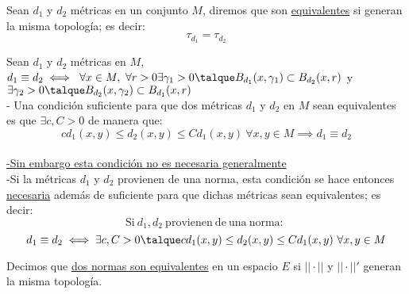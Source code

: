 	\begin{defi} Sean $d_1$ y $d_2$ m\'etricas en un conjunto $M$, diremos que son 				 					\underline{equivalentes} si generan la misma topolog\'ia; es decir:
		\[\tau_{d_1}=\tau_{d_2}\]
	\end{defi}
	
	\begin{proposicion} Sean $d_1$ y $d_2$ m\'etricas en $M$, $d_1 \equiv d_2 \iff \ \forall x\in M, \ \forall r>0 \\ \exists\gamma_1>0\talque B_{d_1}(x,\gamma_1)\subset B_{d_2}(x,r)$ y $ \exists\gamma_2>0\talque B_{d_2}(x,\gamma_2)\subset B_{d_1}(x,r)$\\
	
	- Una condici\'on suficiente para que dos m\'etricas $d_1$ y $d_2$ en $M$ sean equivalentes es que $\exists c,C>0$ de manera que:
	\[cd_1(x,y)\leq d_2(x,y)\leq Cd_1(x,y)\ \forall x,y\in M\implies d_1\equiv d_2\] \\
	\underline{-Sin embargo esta condici\'on no es necesaria generalmente}\\
	-Si la m\'etricas $d_1$ y $d_2$ provienen de una norma, esta condici\'on se hace entonces \underline{necesaria} adem\'as de suficiente para que dichas m\'etricas sean equivalentes; es decir:
	\[\mathrm{Si\ }d_1,d_2\mathrm{\ provienen\ de\ una\ norma:\ }\]
	\[d_1\equiv d_2\iff \exists c,C>0 \talque cd_1(x,y)\leq d_2(x,y)\leq Cd_1(x,y)\ \forall x,y\in M\]
	\end{proposicion}	
	
	\begin{defi} Decimos que \underline{dos normas son equivalentes} en un espacio $E$ si $||\cdot||$ y $||\cdot||'$ generan la misma topolog\'ia.
	\end{defi}
	
